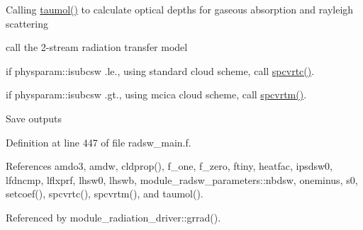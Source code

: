 \begin{DoxyEnumerate}
\item Calling \hyperlink{group__module__radsw__main_gaafef1e054b5103007f57129c07fcba81}{taumol()} to calculate optical depths for gaseous absorption and rayleigh scattering
\item call the 2-\/stream radiation transfer model
\begin{DoxyItemize}
\item if physparam\+::isubcsw .le., using standard cloud scheme, call \hyperlink{group__module__radsw__main_gaed15bfde1b9f2286c58f6c807f8bf479}{spcvrtc()}.
\item if physparam\+::isubcsw .gt., using mcica cloud scheme, call \hyperlink{group__module__radsw__main_gae30ee993080f035f0e05cda7c7baffce}{spcvrtm()}.
\end{DoxyItemize}
\item Save outputs 
\end{DoxyEnumerate}

Definition at line 447 of file radsw\+\_\+main.\+f.



References amdo3, amdw, cldprop(), f\+\_\+one, f\+\_\+zero, ftiny, heatfac, ipsdsw0, lfdncmp, lflxprf, lhsw0, lhswb, module\+\_\+radsw\+\_\+parameters\+::nbdsw, oneminus, s0, setcoef(), spcvrtc(), spcvrtm(), and taumol().



Referenced by module\+\_\+radiation\+\_\+driver\+::grrad().



